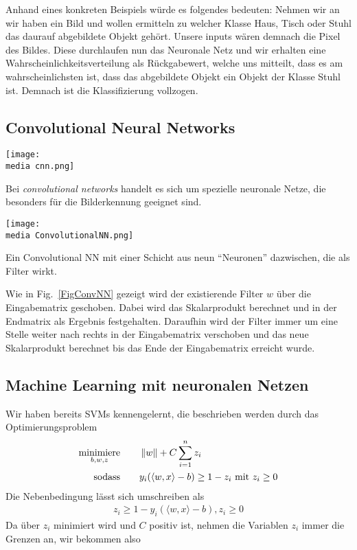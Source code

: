 Anhand eines konkreten Beispiels würde es folgendes bedeuten:
Nehmen wir an wir haben ein Bild und wollen ermitteln zu welcher Klasse Haus, Tisch oder Stuhl das daurauf abgebildete Objekt gehört. Unsere inputs wären demnach die Pixel des Bildes. Diese durchlaufen nun das Neuronale Netz und wir erhalten eine Wahrscheinlichkeitsverteilung als Rückgabewert, welche uns mitteilt, dass es am wahrscheinlichsten ist, dass das abgebildete Objekt ein Objekt der Klasse Stuhl ist. Demnach ist die Klassifizierung vollzogen.

\subsection{Convolutional Neural Networks}
\label{ml:cnn}
\begin{dsafigure}
  \centering
		\texttt{[image: \\media cnn.png]}
		\caption{Ein Convolutional Neural Network (CNN) (deutsch \enquote{faltendes neurales Netzwerk}) %
		}
		\label{FigConvNN}
\end{dsafigure}
\noindent Bei \emph{convolutional networks} handelt es sich um spezielle neuronale Netze, die besonders für die Bilderkennung geeignet sind.

\begin{dsafigure}
  \centering
		\texttt{[image: \\media ConvolutionalNN.png]}
		\caption{Ein Convolutional NN mit einer Schicht aus neun \enquote{Neuronen} dazwischen, die als Filter wirkt. }
		\label{FigConvNN}
\end{dsafigure}

Wie in Fig.~\ref{FigConvNN} gezeigt wird der existierende Filter $w$ über die Eingabematrix geschoben. Dabei wird das Skalarprodukt berechnet und in der Endmatrix als Ergebnis festgehalten. Daraufhin wird der Filter immer um eine Stelle weiter nach rechts in der Eingabematrix verschoben und das neue Skalarprodukt berechnet bis das Ende der Eingabematrix erreicht wurde.

\subsection{Machine Learning mit neuronalen Netzen}

Wir haben bereits SVMs kennengelernt, die beschrieben werden durch das Optimierungsproblem
\begin{align*}
\underset{b,w,z}{\text{minimiere}} &\qquad\left\lVert w\right\rVert + C  \sum_{i=1}^{n} z_i\\
\text{sodass} &\qquad y_i (\langle w,x \rangle - b) \geq 1 - z_i \text { mit } z_i \geq 0
\end{align*}
Die Nebenbedingung lässt sich umschreiben als
\begin{align*}
z_i \geq 1- y_i (\langle w,x \rangle - b), z_i \geq 0
\end{align*}
Da über $z_i$ minimiert wird und $C$ positiv ist, nehmen die Variablen $z_i$ immer die Grenzen an, wir bekommen also

